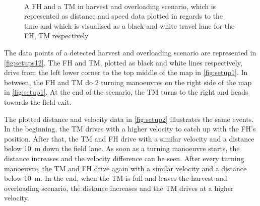 \begin{figure}%
    \centering
   \\
    \caption{A \acf{FH} and a \acf{TM} in harvest and overloading scenario, which is represented as distance and speed data plotted in regards to the
   time and which is visualised as a black and white travel lane for the \ac{FH}, \ac{TM} respectively}%
    \label{fig:setups12}%
\end{figure}

The data points of a detected harvest and overloading scenario are represented in \autoref{fig:setups12}.
The \ac{FH} and \ac{TM}, plotted as black and white lines respectively, drive from the left lower corner to the top middle of the map in \autoref{fig:setup1}.
In between, the \ac{FH} and \ac{TM} do \num{2} turning manoeuvres on the right side of the map in \autoref{fig:setup1}.
At the end of the scenario, the \ac{TM} turns to the right and heads towards the field exit.

The plotted distance and velocity data in \autoref{fig:setup2} illustrates the same events.
In the beginning, the \ac{TM} drives with a higher velocity to catch up with the \ac{FH}'s position.
After that, the \ac{TM} and \ac{FH} drive with a similar velocity and a distance below \SI{10}{\metre} down the field lane.
As soon as a turning manoeuvre starts, the distance increases and the velocity difference can be seen.
After every turning manoeuvre, the \ac{TM} and \ac{FH} drive again with a similar velocity and a distance below \SI{10}{\metre}.
In the end, when the \ac{TM} is full and leaves the harvest and overloading scenario, the distance increases and the \ac{TM} drives at a higher velocity.

